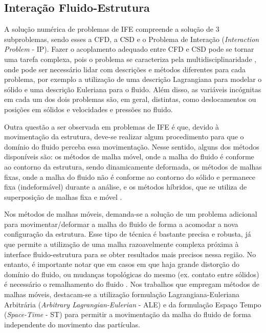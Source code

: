 \subsection{Interação Fluido-Estrutura} \label{IFE}

A solução numérica de problemas de IFE compreende a solução de 3 subproblemas, sendo esses a CFD, a CSD e o Problema de Interação (\textit{Interaction Problem} - IP). Fazer o acoplamento adequado entre CFD e CSD pode se tornar uma tarefa complexa, pois o problema se caracteriza pela multidisciplinaridade \cite{hou2012numerical}, onde pode ser necessário lidar com descrições e métodos diferentes para cada problema, por exemplo a utilização de uma descrição Lagrangiana para modelar o sólido e uma descrição Euleriana para o fluido. Além disso, as variáveis incógnitas em cada um dos dois problemas são, em geral, distintas, como deslocamentos ou posições em sólidos e velocidades e pressões no fluido.

Outra questão a ser observada em problemas de IFE é que, devido à movimentação da estrutura, deve-se realizar algum procedimento para que o domínio do fluido perceba essa movimentação. Nesse sentido, alguns dos métodos disponíveis são: os métodos de malha móvel, onde a malha do fluido é conforme ao contorno da estrutura, sendo dinamicamente deformada, os métodos de malhas fixas, onde a malha do fluido não é conforme ao contorno do sólido e permanece fixa (indeformável) durante a análise, e os métodos híbridos, que se utiliza de superposição de malhas fixa e móvel \cite{fernandes2020tecnica}.

Nos métodos de malhas móveis, demanda-se a solução de um problema adicional para movimentar/deformar a malha do fluido de forma a acomodar a nova configuração da estrutura. Esse tipo de técnica é bastante precisa e robusta, já que permite a utilização de uma malha razoavelmente complexa próxima à interface fluido-estrutura para se obter resultados mais precisos nessa região. No entanto, é importante notar que em casos em que haja grande distorção do domínio do fluido, ou mudanças topológicas do mesmo (ex. contato entre sólidos) é necessário o remalhamento do fluido \cite{terahara2020heart}.  Nos trabalhos que empregam métodos de malhas móveis, destacam-se a utilização formulação Lagrangiana-Euleriana Arbitrária (\textit{Arbitrary Lagrangian-Eulerian} - ALE) \cite{donea1982arbitrary,kanchi20073d,fernandes2019ale} e da formulação Espaço Tempo (\textit{Space-Time} - ST) \cite{takizawa2011multiscale,terahara2020heart,takizawa2011stabilized} para permitir a movimentação da malha do fluido de forma independente do movimento das partículas.


